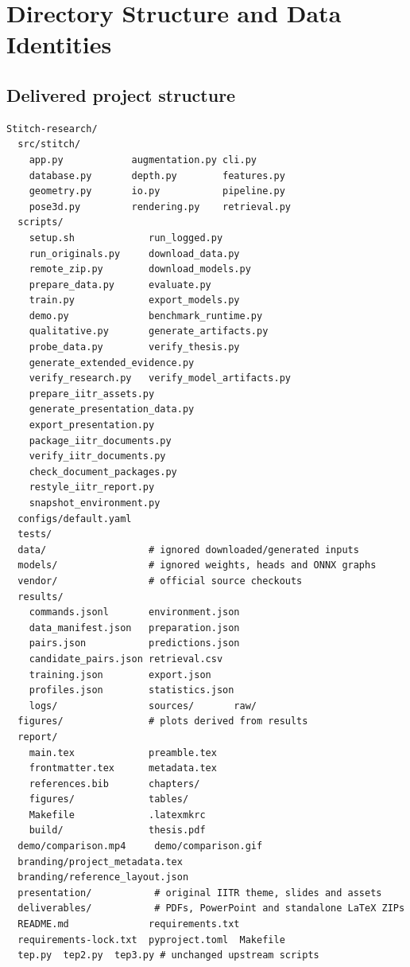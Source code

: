 \chapter{Directory Structure and Data Identities}\label{app:structure}
\section{Delivered project structure}
\begin{lstlisting}[numbers=none]
Stitch-research/
  src/stitch/
    app.py            augmentation.py cli.py
    database.py       depth.py        features.py
    geometry.py       io.py           pipeline.py
    pose3d.py         rendering.py    retrieval.py
  scripts/
    setup.sh             run_logged.py
    run_originals.py     download_data.py
    remote_zip.py        download_models.py
    prepare_data.py      evaluate.py
    train.py             export_models.py
    demo.py              benchmark_runtime.py
    qualitative.py       generate_artifacts.py
    probe_data.py        verify_thesis.py
    generate_extended_evidence.py
    verify_research.py   verify_model_artifacts.py
    prepare_iitr_assets.py
    generate_presentation_data.py
    export_presentation.py
    package_iitr_documents.py
    verify_iitr_documents.py
    check_document_packages.py
    restyle_iitr_report.py
    snapshot_environment.py
  configs/default.yaml
  tests/
  data/                  # ignored downloaded/generated inputs
  models/                # ignored weights, heads and ONNX graphs
  vendor/                # official source checkouts
  results/
    commands.jsonl       environment.json
    data_manifest.json   preparation.json
    pairs.json           predictions.json
    candidate_pairs.json retrieval.csv
    training.json        export.json
    profiles.json        statistics.json
    logs/                sources/       raw/
  figures/               # plots derived from results
  report/
    main.tex             preamble.tex
    frontmatter.tex      metadata.tex
    references.bib       chapters/
    figures/             tables/
    Makefile             .latexmkrc
    build/               thesis.pdf
  demo/comparison.mp4     demo/comparison.gif
  branding/project_metadata.tex
  branding/reference_layout.json
  presentation/           # original IITR theme, slides and assets
  deliverables/           # PDFs, PowerPoint and standalone LaTeX ZIPs
  README.md              requirements.txt
  requirements-lock.txt  pyproject.toml  Makefile
  tep.py  tep2.py  tep3.py # unchanged upstream scripts
\end{lstlisting}


